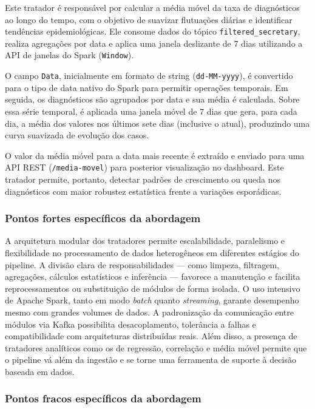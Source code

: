 \documentclass[a4paper,12pt]{article}
\begin{document}
Este tratador é responsável por calcular a média móvel da taxa de diagnósticos ao longo do tempo, com o objetivo de suavizar flutuações diárias e identificar tendências epidemiológicas. Ele consome dados do tópico \texttt{filtered\_secretary}, realiza agregações por data e aplica uma janela deslizante de 7 dias utilizando a API de janelas do Spark (\texttt{Window}).

O campo \texttt{Data}, inicialmente em formato de string (\texttt{dd-MM-yyyy}), é convertido para o tipo de data nativo do Spark para permitir operações temporais. Em seguida, os diagnósticos são agrupados por data e sua média é calculada. Sobre essa série temporal, é aplicada uma janela móvel de 7 dias que gera, para cada dia, a média dos valores nos últimos sete dias (inclusive o atual), produzindo uma curva suavizada de evolução dos casos.

O valor da média móvel para a data mais recente é extraído e enviado para uma API REST (\texttt{/media-movel}) para posterior visualização no dashboard. Este tratador permite, portanto, detectar padrões de crescimento ou queda nos diagnósticos com maior robustez estatística frente a variações esporádicas.

\subsubsection*{Pontos fortes específicos da abordagem}

A arquitetura modular dos tratadores permite escalabilidade, paralelismo e flexibilidade no processamento de dados heterogêneos em diferentes estágios do pipeline. A divisão clara de responsabilidades — como limpeza, filtragem, agregações, cálculos estatísticos e inferência — favorece a manutenção e facilita reprocessamentos ou substituição de módulos de forma isolada. O uso intensivo de Apache Spark, tanto em modo \textit{batch} quanto \textit{streaming}, garante desempenho mesmo com grandes volumes de dados. A padronização da comunicação entre módulos via Kafka possibilita desacoplamento, tolerância a falhas e compatibilidade com arquiteturas distribuídas reais. Além disso, a presença de tratadores analíticos como os de regressão, correlação e média móvel permite que o pipeline vá além da ingestão e se torne uma ferramenta de suporte à decisão baseada em dados.


\subsubsection*{Pontos fracos específicos da abordagem}
\end{document}
